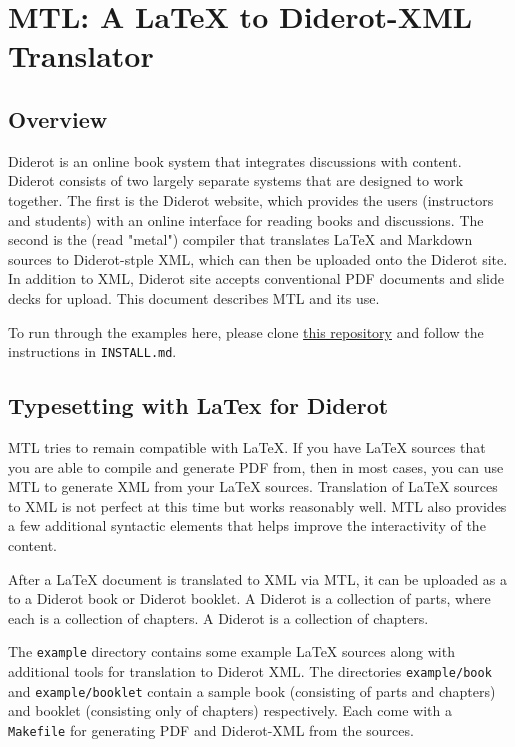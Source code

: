 \chapter{MTL: A LaTeX to Diderot-XML Translator}
\label{mtl}
 

\section{Overview}
Diderot is an online book system that integrates discussions with content.  Diderot consists of two largely separate systems that are designed to work together.  The first is the Diderot website, which provides the users (instructors and students) with an online interface for reading books and discussions.  The second is the  (read "metal") compiler that translates LaTeX and Markdown sources to Diderot-stple XML, which can then be uploaded onto the Diderot site.  In addition to XML, Diderot site accepts conventional PDF documents and slide decks for upload.  This document describes MTL and its use.  


\begin{important}
To run through the examples here, please clone 
%
\href{https://github.com/diderot-edu/guide}{this repository}
%
and follow the instructions in \lstinline`INSTALL.md`. 
\end{important}

\section{Typesetting with LaTex for Diderot}

MTL tries to remain compatible with LaTeX.   If you have  LaTeX sources that you are able to compile and generate PDF from, then in most cases, you can use MTL to generate XML from your LaTeX sources.  Translation of LaTeX sources to XML is not perfect at this time but works reasonably well. MTL also provides a few additional syntactic elements that helps improve the interactivity of the content.  

\begin{definition}
After a LaTeX document is translated to XML via MTL, it can be uploaded as a  to a Diderot book or Diderot booklet.  
%
A Diderot  is a collection of parts, where each  is a collection of chapters.
%
A Diderot  is a collection of chapters. 
\end{definition}

\begin{example}
The \lstinline`example` directory contains some example LaTeX sources along with additional tools for translation to Diderot XML.
%
The directories \lstinline`example/book` and \lstinline`example/booklet` contain a sample book (consisting of parts and chapters) and booklet (consisting only of chapters) respectively.
%
Each come with a  \lstinline`Makefile` for generating PDF and Diderot-XML from the sources. 
\end{example}

